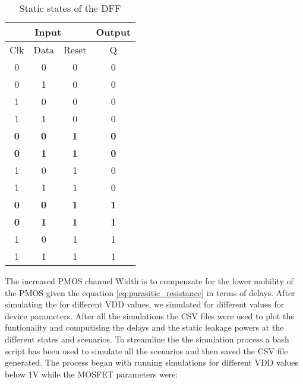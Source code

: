\begin{table}[H]
    \centering
    \caption{Static states of the DFF}
    \label{tab:static_states}
    \begin{tabular}{cccc}
        \hline
        \multicolumn{3}{c}{Input}                                 & Output                          \\ \hline
        Clk                             & Data       & Reset      & Q                               \\ \hline
        0                               & 0          & 0          & 0                               \\
        0                               & 1          & 0          & 0                               \\
        1                               & 0          & 0          & 0                               \\
        1                               & 1          & 0          & 0                               \\ \hline
        \multicolumn{1}{|c}{\textbf{0}} & \textbf{0} & \textbf{1} & \multicolumn{1}{c|}{\textbf{0}} \\ \hline
        \multicolumn{1}{|c}{\textbf{0}} & \textbf{1} & \textbf{1} & \multicolumn{1}{c|}{\textbf{0}} \\ \hline
        1                               & 0          & 1          & 0                               \\
        1                               & 1          & 1          & 0                               \\ \hline
        \multicolumn{1}{|c}{\textbf{0}} & \textbf{0} & \textbf{1} & \multicolumn{1}{c|}{\textbf{1}} \\ \hline
        \multicolumn{1}{|c}{\textbf{0}} & \textbf{1} & \textbf{1} & \multicolumn{1}{c|}{\textbf{1}} \\ \hline
        1                               & 0          & 1          & 1                               \\
        1                               & 1          & 1          & 1                              
    \end{tabular}
\end{table}

The increased PMOS channel Width is to compensate for the lower mobility of the PMOS given the equation \ref{eq:parasitic_resistance} in terms of delays. After simulating the for different VDD values, we simulated for different values for device parameters. After all the simulations the CSV files were used to plot the funtionality and computising the delays and the static leakage powers at the different states and scenarios. 
To streamline the the simulation process a bash script has been used to simulate all the scenarios and then saved the CSV file generated. The process began with running simulations for different VDD values below 1V while the MOSFET parameters were: